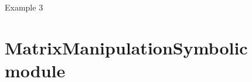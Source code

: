 \documentclass[letterpaper,10pt,english,openany,oneside]{sphinxmanual}
\begin{document}

\begin{fulllineitems}
\label{\detokenize{MatrixManipulation:MatrixManipulation.main}}
Example 3

\end{fulllineitems}



\chapter{MatrixManipulationSymbolic module}
\label{\detokenize{MatrixManipulationSymbolic:module-MatrixManipulationSymbolic}}\label{\detokenize{MatrixManipulationSymbolic:matrixmanipulationsymbolic-module}}\label{\detokenize{MatrixManipulationSymbolic::doc}}
\end{document}
